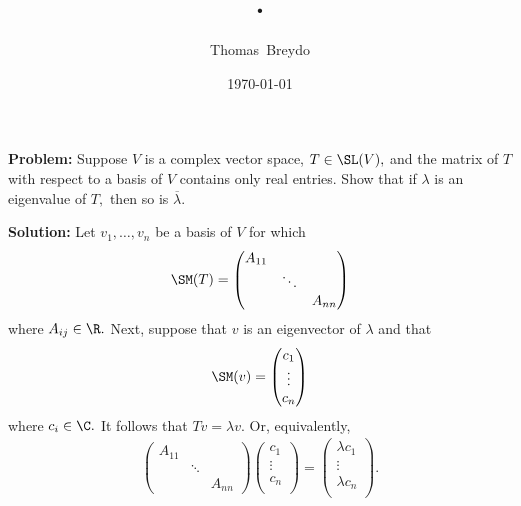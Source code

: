 \documentclass{amsart}
\title{\pagenum.\probnum}
\author{Thomas\ Breydo}
\date{\today}
\begin{document}
\maketitle

\textbf{Problem:} Suppose $V$ is a complex vector space,
$T\in\SL(V),$ and the matrix of $T$ with respect
to a basis of $V$ contains only real entries. Show that if $\lambda$
is an eigenvalue of $T,$ then so is $\overline\lambda.$

\vspace{0.5in}

\newcommand{\basis}{v_1,\ldots,v_n} 

\textbf{Solution:} Let $\basis$ be a basis of $V$ for which
\begin{align*}
    \SM(T)=\begin{pmatrix}
        A_{11} & & \\
               & \ddots & \\
               & & A_{nn}
    \end{pmatrix}
\end{align*}
where $A_{ij}\in\R.$ Next, suppose that $v$ is an eigenvector of $\lambda$ and that
\begin{align*}
    \SM(v)=\begin{pmatrix}
        c_1\\
        \vdots\\
        c_n\\
    \end{pmatrix}
\end{align*}
where $c_i\in\C.$ It follows that $Tv=\lambda v.$ Or, equivalently,
\begin{align*}
    \begin{pmatrix}
        A_{11} & & \\
               & \ddots & \\
               & & A_{nn}
    \end{pmatrix}\begin{pmatrix}
        c_1\\
        \vdots\\
        c_n\\
    \end{pmatrix}
    =\begin{pmatrix}
        \lambda c_1\\
        \vdots\\
        \lambda c_n\\
    \end{pmatrix}.
\end{align*}
\end{document}

